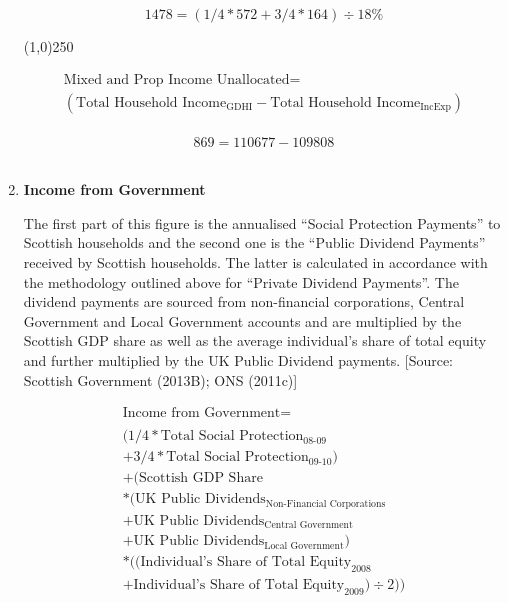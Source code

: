 \begin{enumerate}
\begin{equation} \nonumber
1478 = (1/4*572+3/4*164)\div 18\%
\end{equation}

\begin{center}
\line(1,0){250}
\end{center}


\begin{equation} 
\begin{split}
\text{Mixed and Prop Income Unallocated} = \\ 
(\text{Total Household Income}_\text{GDHI}-\text{Total Household Income}_\text{IncExp})\\
\end{split} \label{eq:2.5.7}
\end{equation} 

\begin{equation} \nonumber
869 = 110677-109808
\end{equation}\\

\item \textbf {Income from Government}

The first part of this figure is the annualised “Social Protection Payments” to Scottish households and the second one is the “Public Dividend Payments” received by Scottish households. The latter is calculated in accordance with the methodology outlined above for “Private Dividend Payments”. The dividend payments are sourced from non-financial corporations, Central Government and Local Government accounts and are multiplied by the Scottish GDP share as well as the average individual’s share of total equity and further multiplied by the UK Public Dividend payments. [Source: Scottish Government (2013B); ONS (2011c)]

\begin{equation}
\begin{split}
\text{Income from Government} =  \\ \\
(1/4*\text{Total Social Protection}_\text{08-09}\\
+3/4*\text{Total Social Protection}_\text{09-10})\\
+(\text{Scottish GDP Share} \\
*(\text{UK Public Dividends}_\text{Non-Financial Corporations}\\
+\text{UK Public Dividends}_\text{Central Government}\\
+\text{UK Public Dividends}_\text{Local Government})\\
*((\text{Individual's Share of Total Equity}_\text{2008}\\
+\text{Individual's Share of Total Equity}_\text{2009})\div 2))
\end{split} \label{eq:2.5.8}
\end{equation}



\end{enumerate}
